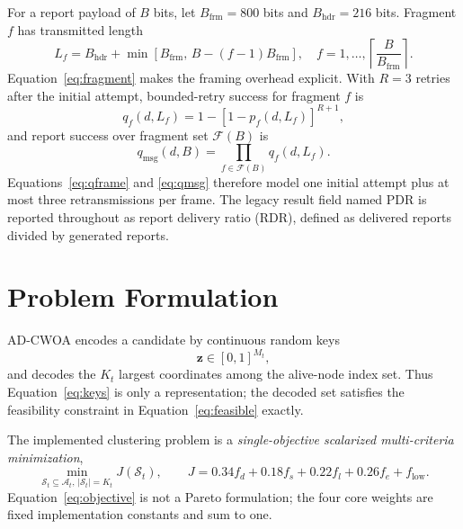 \documentclass[pdflatex,sn-mathphys-num]{sn-jnl}
\begin{document}
For a report payload of $B$ bits, let $B_{\mathrm{frm}}=800$ bits and $B_{\mathrm{hdr}}=216$ bits. Fragment $f$ has transmitted length
\begin{equation}
L_f=B_{\mathrm{hdr}}+\min\!\left[B_{\mathrm{frm}},\,B-(f-1)B_{\mathrm{frm}}\right],\quad
f=1,\ldots,\left\lceil\frac{B}{B_{\mathrm{frm}}}\right\rceil.
\label{eq:fragment}
\end{equation}
Equation~\eqref{eq:fragment} makes the framing overhead explicit. With $R=3$ retries after the initial attempt, bounded-retry success for fragment $f$ is
\begin{equation}
q_f(d,L_f)=1-[1-p_f(d,L_f)]^{R+1},
\label{eq:qframe}
\end{equation}
and report success over fragment set $\mathcal{F}(B)$ is
\begin{equation}
q_{\mathrm{msg}}(d,B)=\prod_{f\in\mathcal{F}(B)}q_f(d,L_f).
\label{eq:qmsg}
\end{equation}
Equations~\eqref{eq:qframe} and \eqref{eq:qmsg} therefore model one initial attempt plus at most three retransmissions per frame. The legacy result field named PDR is reported throughout as report delivery ratio (RDR), defined as delivered reports divided by generated reports.

\section{Problem Formulation}

AD-CWOA encodes a candidate by continuous random keys
\begin{equation}
\mathbf{z}\in[0,1]^{M_t},
\label{eq:keys}
\end{equation}
and decodes the $K_t$ largest coordinates among the alive-node index set. Thus Equation~\eqref{eq:keys} is only a representation; the decoded set satisfies the feasibility constraint in Equation~\eqref{eq:feasible} exactly.

The implemented clustering problem is a \emph{single-objective scalarized multi-criteria minimization},
\begin{equation}
\min_{\mathcal{S}_t\subseteq\mathcal{A}_t,\,|\mathcal{S}_t|=K_t}
J(\mathcal{S}_t),\qquad
J=0.34f_d+0.18f_s+0.22f_l+0.26f_e+f_{\mathrm{low}}.
\label{eq:objective}
\end{equation}
Equation~\eqref{eq:objective} is not a Pareto formulation; the four core weights are fixed implementation constants and sum to one.
\end{document}
